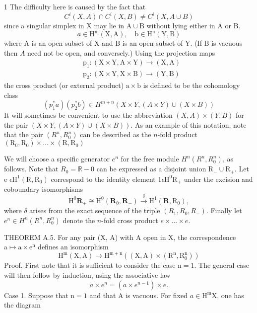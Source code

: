 \documentclass[10pt]{article}
\begin{document}
1 The difficulty here is caused by the fact that
$$
C^{i}(X, A) \cap C^{i}(X, B) \neq C^{i}(X, A \cup B)
$$
since a singular simplex in $\mathrm{X}$ may lie in $\mathrm{A} \cup \mathrm{B}$ without lying either in $\mathrm{A}$ or $\mathrm{B}$.
$$
a \in \mathrm{H}^{\mathrm{m}}(\mathrm{X}, \mathrm{A}), \quad \mathrm{b} \in \mathrm{H}^{\mathrm{n}}(\mathrm{Y}, \mathrm{B})
$$
where $\mathrm{A}$ is an open subset of $\mathrm{X}$ and $\mathrm{B}$ is an open subset of $\mathrm{Y}$. (If $\mathrm{B}$ is vacuous then $A$ need not be open, and conversely.) Using the projection maps
$$
\begin{aligned}
&\mathrm{p}_{1}:(\mathrm{X} \times \mathrm{Y}, \mathrm{A} \times \mathrm{Y}) \rightarrow(\mathrm{X}, \mathrm{A}) \\
&\mathrm{p}_{2}:(\mathrm{X} \times \mathrm{Y}, \mathrm{X} \times \mathrm{B}) \rightarrow(\mathrm{Y}, \mathrm{B})
\end{aligned}
$$
the cross product (or external product) $\mathrm{a} \times \mathrm{b}$ is defined to be the cohomology class
$$
\left(p_{1}^{*} a\right)\left(p_{2}^{*} b\right) \in H^{m+n}(X \times Y,(A \times Y) \cup(X \times B))
$$
It will sometimes be convenient to use the abbreviation $(X, A) \times(Y, B)$ for the pair $(X \times Y,(A \times Y) \cup(X \times B))$. As an example of this notation, note that the pair $\left(R^{n}, R_{0}^{n}\right)$ can be described as the $n$-fold product $\left(\mathrm{R}_{0}, \mathrm{R}_{0}\right) \times \ldots \times\left(\mathrm{R}, \mathrm{R}_{0}\right)$

We will choose a specific generator $e^{n}$ for the free module $H^{n}\left(R^{n}, R_{0}^{n}\right)$, as follows. Note that $R_{0}=\mathbb{R}-0$ can be expressed as a disjoint union $\mathrm{R}_{-} \cup \mathrm{R}_{+}$. Let e $\epsilon \mathrm{H}^{1}\left(\mathrm{R}, \mathrm{R}_{0}\right)$ correspond to the identity element $1 \epsilon \mathrm{H}^{0} \mathrm{R}_{+}$ under the excision and coboundary isomorphisms
$$
\mathrm{H}^{0} \mathbf{R}_{+} \cong \mathrm{H}^{0}\left(\mathbf{R}_{0}, \mathbf{R}_{-}\right) \stackrel{\delta}{\longrightarrow} \mathrm{H}^{1}\left(\mathbf{R}, \mathrm{R}_{0}\right),
$$
where $\delta$ arises from the exact sequence of the triple $\left(R_{1}, R_{0}, R_{-}\right)$. Finally let $e^{n} \in H^{n}\left(R^{n}, R_{0}^{n}\right)$ denote the $n$-fold cross product $e \times \ldots \times e$.

THEOREM A.5. For any pair (X, A) with $\mathrm{A}$ open in $\mathrm{X}$, the correspondence $\mathrm{a} \mapsto \mathrm{a} \times \mathrm{e}^{\mathrm{n}}$ defines an isomorphism
$$
\mathrm{H}^{\mathrm{m}}(\mathrm{X}, \mathrm{A}) \rightarrow \mathrm{H}^{\mathrm{m}+\mathrm{n}}\left((\mathrm{X}, \mathrm{A}) \times\left(\mathrm{R}^{\mathrm{n}}, \mathrm{R}_{0}^{\mathrm{n}}\right)\right)
$$
Proof. First note that it is sufficient to consider the case $\mathrm{n}=1$. The general case will then follow by induction, using the associative law
$$
a \times e^{n}=\left(a \times e^{n-1}\right) \times e .
$$
Case 1. Suppose that $\mathrm{n}=1$ and that $\mathrm{A}$ is vacuous. For fixed $a \in \mathrm{H}^{\mathrm{m}} \mathrm{X}$, one has the diagram
\end{document}
